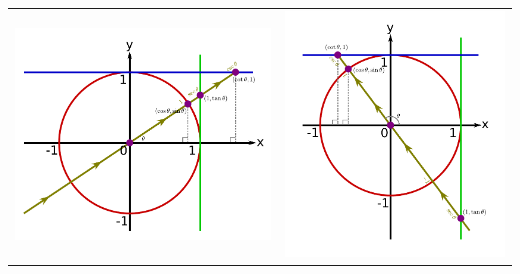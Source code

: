\documentclass{article}
\begin{document}
\begin{tabular}{cc}
\includegraphics[scale = 0.6]{unit_circle_trig_functions_acute_angle} & 
\includegraphics[scale = 0.6]{unit_circle_trig_functions_obtuse_angle} \\

\end{tabular}
\end{document}
